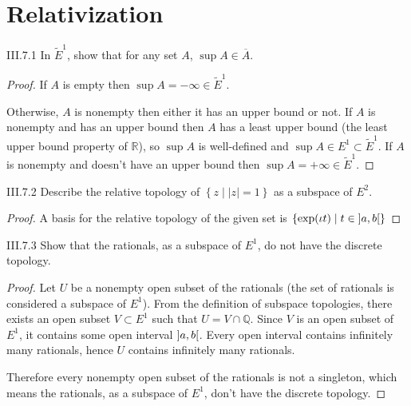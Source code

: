 \section{Relativization}

\begin{problem}{III.7.1}
In \( {\tilde{E}}^{1} \), show that for any set \(A\), \(\sup A \in \overline{A}\).
\end{problem}

\begin{proof}
	If \( A \) is empty then \( \sup A = -\infty \in \tilde{E}^{1} \).

	Otherwise, \( A \) is nonempty then either it has an upper bound or not. If \(A\) is nonempty and has an upper bound then \(A\) has a least upper bound (the least upper bound property of \(\mathbb{R}\)), so \( \sup A \) is well-defined and \( \sup A \in E^{1} \subset \tilde{E}^{1} \). If \( A \) is nonempty and doesn't have an upper bound then \( \sup A = +\infty \in \tilde{E}^{1} \).
\end{proof}

\begin{problem}{III.7.2}
Describe the relative topology of \( \left\{ z \mid \left\vert{z}\right\vert = 1 \right\} \) as a subspace of \(E^{2}\).
\end{problem}

\begin{proof}
	A basis for the relative topology of the given set is \( \left\{ \exp(\iota t) \mid t \in \left\rbrack{a,b}\right\lbrack \right\} \)
\end{proof}

\begin{problem}{III.7.3}
Show that the rationals, as a subspace of \(E^{1}\), do not have the discrete topology.
\end{problem}

\begin{proof}
	Let \(U\) be a nonempty open subset of the rationals (the set of rationals is considered a subspace of \(E^{1}\)). From the definition of subspace topologies, there exists an open subset \(V \subset E^{1}\) such that \(U = V \cap \mathbb{Q}\). Since \(V\) is an open subset of \(E^{1}\), it contains some open interval \(\left\rbrack{a, b}\right\lbrack\). Every open interval contains infinitely many rationals, hence \(U\) contains infinitely many rationals.

	Therefore every nonempty open subset of the rationals is not a singleton, which means the rationals, as a subspace of \(E^{1}\), don't have the discrete topology.
\end{proof}

